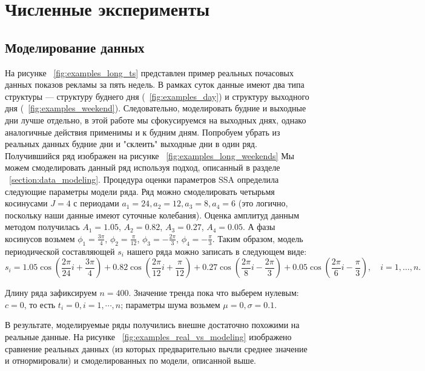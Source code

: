 \documentclass[%
12pt,
master,  %
natbib,      %
subf,        %
substylefile = spbu.rtx,
href,        %
colorlinks,  %
]{disser}
\begin{document}
\chapter{Численные эксперименты}


\section{Моделирование данных}

На рисунке ~\ref{fig:examples_long_ts} представлен пример реальных почасовых данных показов рекламы за пять недель. В рамках суток данные имеют два типа структуры --- структуру буднего дня (~\ref{fig:examples_day}) и структуру выходного дня (~\ref{fig:examples_weekend}). Следовательно, моделировать будние и выходные дни лучше отдельно, в этой работе мы сфокусируемся на выходных днях, однако аналогичные действия применимы и к будним дням. Попробуем убрать из реальных данных будние дни и "склеить" выходные дни в один ряд. Получившийся ряд изображен на рисунке ~\ref{fig:examples_long_weekends}
Мы можем смоделировать данный ряд используя подход, описанный в разделе ~\ref{section:data_modeling}. 
Процедура оценки параметров SSA определила следующие параметры модели ряда. Ряд можно смоделировать четырьмя косинусами $J=4$ с периодами $a_1 = 24, a_2 = 12, a_3 = 8, a_4 = 6$ (это логично, поскольку наши данные имеют суточные колебания). Оценка амплитуд данным методом получилась $A_1 = 1.05$, $A_2 = 0.82$, $A_3 = 0.27$, $A_4 = 0.05$. А фазы косинусов возьмем $\phi_1 = \frac{3\pi}{4}$, $\phi_2 = \frac{\pi}{12}$, $\phi_3 = -\frac{2\pi}{3}$, $\phi_4 = -\frac{\pi}{3}$. Таким образом, модель периодической составляющей $s_i$ нашего ряда можно записать в следующем виде:
$$ s_i = 1.05\cos(\frac{2\pi}{24}i + \frac{3\pi}{4}) + 
                    0.82\cos(\frac{2\pi}{12}i + \frac{\pi}{12}) + 
                    0.27\cos(\frac{2\pi}{8}i - \frac{2\pi}{3}) + 
                    0.05\cos(\frac{2\pi}{6}i - \frac{\pi}{3}), \quad i = 1, \dots, n.$$

Длину ряда зафиксируем $n = 400$. Значение тренда пока что выберем нулевым: $c = 0$, то есть $t_i = 0, i = 1,\cdots, n$; параметры шума возьмем $\mu = 0, \sigma = 0.1$.

В результате, моделируемые ряды получились внешне достаточно похожими на реальные данные. На рисунке ~\ref{fig:examples_real_vs_modeling} изображено сравнение реальных данных (из которых предварительно вычли среднее значение и отнормировали) и смоделированных по модели, описанной выше.
\end{document}
